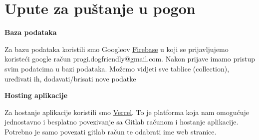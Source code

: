 			\eject 
		
		\section{Upute za puštanje u pogon}
		

   \textbf{Baza podataka}

    Za bazu podataka koristili smo Googleov \href{https://firebase.google.com/}{Firebase} u koji se prijavljujemo koristeći google račun progi.dogfriendly@gmail.com. Nakon prijave imamo pristup svim podatcima u bazi podataka. Možemo vidjeti sve tablice (collection), uređivati ih, dodavati/brisati nove podatke

    \textbf{Hosting aplikacije}
    
    Za hostanje aplikacije koristili smo \href{https://vercel.com/}{Vercel}. To je platforma koja nam omogućuje jednostavno i besplatno povezivanje sa Gitlab računom i hostanje aplikacije. Potrebno je samo povezati gitlab račun te odabrati ime web stranice. 
			
			
			\eject 